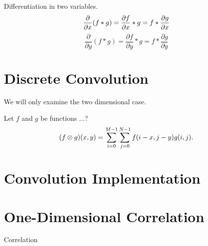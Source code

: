 	Differentiation in two variables.
	\begin{equation*}\index{convolution!derivative 2D}
		\frac{\partial}{\partial x}(f*g)=\frac{\partial f}{\partial x}*g=f*\frac{\partial g}{\partial x}
	\end{equation*}
	\begin{equation*}
		\frac{\partial}{\partial y}(f*g)=\frac{\partial f}{\partial y}*g=f*\frac{\partial g}{\partial y}
	\end{equation*}

\section{Discrete Convolution}
	We will only examine the two dimensional case.
	\begin{dfn}
		Let $f$ and $g$ be functions ...?
		\begin{equation*}\index{convolution!two-dimensional discrete}
			(f\otimes g)(x,y)=\sum_{i=0}^{M-1}\sum_{j=0}^{N-1}f(i-x,j-y)g(i,j).
		\end{equation*}
	\end{dfn}

\section{Convolution Implementation}

	

\section{One-Dimensional Correlation}
	Correlation
	\begin{dfn}
		
	\end{dfn}
